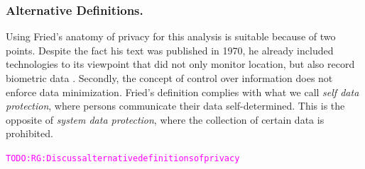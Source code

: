 \documentclass[runningheads,a4paper]{llncs}
\newcommand{\TODO}[1]{\begin{alltt}\textcolor{magenta}{TODO: #1}\end{alltt}}
\begin{document}
\subsubsection{Alternative Definitions.}
Using Fried's anatomy of privacy for this analysis is suitable because of two points.
Despite the fact his text was published in 1970, he already included technologies to its viewpoint that did not only monitor location, but also record biometric data \cite{CFried:Privacy}. 
Secondly, the concept of control over information does not enforce data minimization.
Fried's definition complies with what we call \textit{self data protection}, where persons communicate their data self-determined.
This is the opposite of \textit{system data protection}, where the collection of certain data is prohibited. 

\TODO{RG: Discuss alternative definitions of privacy}

\end{document}

